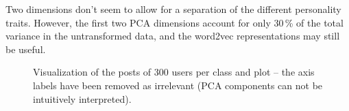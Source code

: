 \documentclass[12pt]{elsarticle}
\begin{document}
Two dimensions don't seem to allow for a separation of the different personality traits. However, the first two PCA dimensions account for only 30\,\% of the total variance in the untransformed data, and the word2vec representations may still be useful.


\begin{figure}[ht]
\label{fig:viz}
\caption{Visualization of the posts of 300 users per class and plot -- the axis labels have been removed as irrelevant (PCA components can not be intuitively interpreted).}

\vspace{1em}
\centering
\begin{minipage}{0.48\textwidth}
  \centering
\end{minipage}
\begin{minipage}{0.48\textwidth}
  \centering
\end{minipage}

\vspace{1em}


\end{figure}
\end{document}
